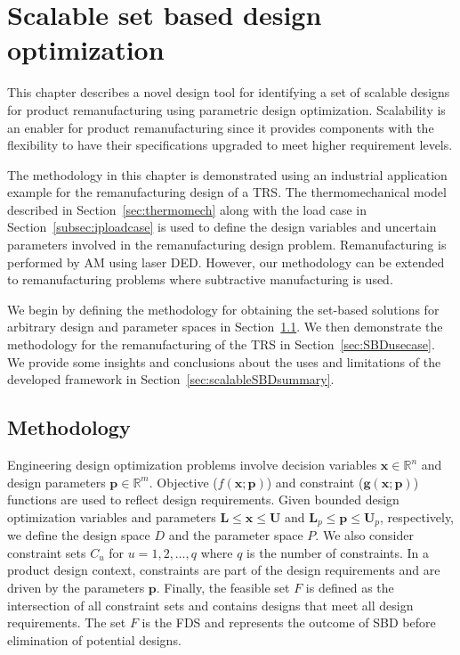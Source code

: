 \chapter{Scalable set based design optimization}
\label{ch:scalableSBD}

This chapter describes a novel design tool for identifying a set of scalable designs for product remanufacturing using parametric design optimization. Scalability is an enabler for product remanufacturing since it provides components with the flexibility to have their specifications upgraded to meet higher requirement levels.

The methodology in this chapter is demonstrated using an industrial application example for the remanufacturing design of a \ac{TRS}. The thermomechanical model described in Section~\ref{sec:thermomech} along with the load case in Section~\ref{subsec:iploadcase} is used to define the design variables and uncertain parameters involved in the remanufacturing design problem. Remanufacturing is performed by \ac{AM} using laser \ac{DED}. However, our methodology can be extended to remanufacturing problems where subtractive manufacturing is used.

We begin by defining the methodology for obtaining the set-based solutions for arbitrary design and parameter spaces in Section~\ref{sec:SBDmethods}. We then demonstrate the methodology for the remanufacturing of the \ac{TRS} in Section~\ref{sec:SBDusecase}. We provide some insights and conclusions about the uses and limitations of the developed framework in Section~\ref{sec:scalableSBDsummary}.

\section{Methodology} \label{sec:SBDmethods}

Engineering design optimization problems involve decision variables $\mathbf{x}  \in \mathbb{R}^n$ and design parameters ${\mathbf{p}}  \in \mathbb{R}^m$. Objective (${f}(\mathbf{x};\mathbf{p})$) and constraint ($\mathbf{g}(\mathbf{x};\mathbf{p})$) functions are used to reflect design requirements. Given bounded design optimization variables and parameters $\mathbf{L} \leq \mathbf{x} \leq \mathbf{U}$ and $\mathbf{L}_p \leq \mathbf{p} \leq \mathbf{U}_p$, respectively, we define the design space $\mathit{D}$ and the parameter space $\mathit{P}$. We also consider constraint sets $\mathit{C}_u$ for $u = 1,2,\ldots,q$ where $q$ is the number of constraints. In a product design context, constraints are part of the design requirements and are driven by the parameters $\mathbf{p}$. Finally, the feasible set $\mathit{F}$ is defined as the intersection of all constraint sets and contains designs that meet all design requirements. The set $\mathit{F}$ is the \ac{FDS} and represents the outcome of \ac{SBD} before elimination of potential designs. 

